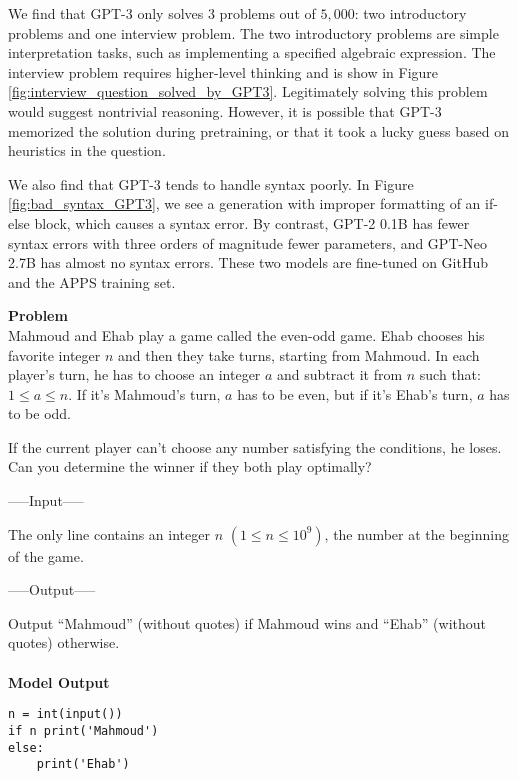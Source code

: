 \documentclass{article}
\begin{document}
We find that GPT-3 only solves $3$ problems out of $5,\!000$: two introductory problems and one interview problem. The two introductory problems are simple interpretation tasks, such as implementing a specified algebraic expression. The interview problem requires higher-level thinking and is show in Figure \ref{fig:interview_question_solved_by_GPT3}. Legitimately solving this problem would suggest nontrivial reasoning. However, it is possible that GPT-3 memorized the solution during pretraining, or that it took a lucky guess based on heuristics in the question.

We also find that GPT-3 tends to handle syntax poorly. In Figure \ref{fig:bad_syntax_GPT3}, we see a generation with improper formatting of an if-else block, which causes a syntax error. By contrast, GPT-2 0.1B has fewer syntax errors with three orders of magnitude fewer parameters, and GPT-Neo 2.7B has almost no syntax errors. These two models are fine-tuned on GitHub and the APPS training set.



\begin{figure*}
    \textbf{Problem} \\
    Mahmoud and Ehab play a game called the even-odd game. Ehab chooses his favorite integer $n$ and then they take turns, starting from Mahmoud. In each player's turn, he has to choose an integer $a$ and subtract it from $n$ such that:  $1 \leq a \leq n$.  If it's Mahmoud's turn, $a$ has to be even, but if it's Ehab's turn, $a$ has to be odd. 

    If the current player can't choose any number satisfying the conditions, he loses. Can you determine the winner if they both play optimally?
    
    \vspace{2mm}
    -----Input-----
    
    The only line contains an integer $n$ $(1 \leq n \leq 10^9)$, the number at the beginning of the game.
    
    \vspace{2mm}
    -----Output-----
    
    Output ``Mahmoud'' (without quotes) if Mahmoud wins and ``Ehab'' (without quotes) otherwise.
 \\
 \\
 \textbf{Model Output}
 \begin{small}
 \begin{verbatim}
n = int(input())
if n print('Mahmoud')
else:
    print('Ehab')
\end{verbatim}
 \end{small}
    \caption{The sole interview problem solved by GPT-3. Legitimately solving this problem requires nontrivial reasoning about the proposed game's branching possibilities.}
    \label{fig:interview_question_solved_by_GPT3}
\end{figure*}
\end{document}
